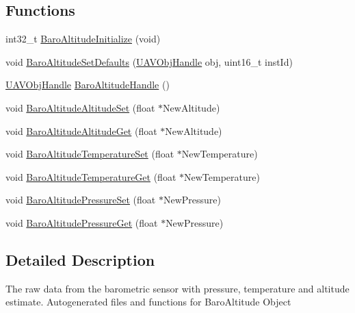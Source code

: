 \subsection*{\-Functions}
\begin{DoxyCompactItemize}
\item 
int32\-\_\-t \hyperlink{group___baro_altitude_gad1310a7af03fb74a553fa5b8a8443a08}{\-Baro\-Altitude\-Initialize} (void)
\item 
void \hyperlink{group___baro_altitude_gab7ca5f2e64b7d1c33fd371508267ae36}{\-Baro\-Altitude\-Set\-Defaults} (\hyperlink{targets_2_u_a_v_objects_2inc_2uavobjectmanager_8h_a279053e22be53ce9f895043aaeb91e3b}{\-U\-A\-V\-Obj\-Handle} obj, uint16\-\_\-t inst\-Id)
\item 
\hyperlink{targets_2_u_a_v_objects_2inc_2uavobjectmanager_8h_a279053e22be53ce9f895043aaeb91e3b}{\-U\-A\-V\-Obj\-Handle} \hyperlink{group___baro_altitude_ga6556373cd821a099c36cfda869a02444}{\-Baro\-Altitude\-Handle} ()
\item 
void \hyperlink{group___baro_altitude_gacb9dd7ef9eff30668ab4ad176b5b661d}{\-Baro\-Altitude\-Altitude\-Set} (float $\ast$\-New\-Altitude)
\item 
void \hyperlink{group___baro_altitude_ga4017759d058ce0d37a93d9d8fe36ead2}{\-Baro\-Altitude\-Altitude\-Get} (float $\ast$\-New\-Altitude)
\item 
void \hyperlink{group___baro_altitude_ga80df8455b3925f38225909653c6602eb}{\-Baro\-Altitude\-Temperature\-Set} (float $\ast$\-New\-Temperature)
\item 
void \hyperlink{group___baro_altitude_gaa4bbf4173d0346a725fbcbb84419f580}{\-Baro\-Altitude\-Temperature\-Get} (float $\ast$\-New\-Temperature)
\item 
void \hyperlink{group___baro_altitude_ga95ce5c05869eedd7e335d0da763b6ab2}{\-Baro\-Altitude\-Pressure\-Set} (float $\ast$\-New\-Pressure)
\item 
void \hyperlink{group___baro_altitude_gaa7ef83482cf797a1017357bee579fffa}{\-Baro\-Altitude\-Pressure\-Get} (float $\ast$\-New\-Pressure)
\end{DoxyCompactItemize}


\subsection{\-Detailed \-Description}
\-The raw data from the barometric sensor with pressure, temperature and altitude estimate. \-Autogenerated files and functions for \-Baro\-Altitude \-Object 

